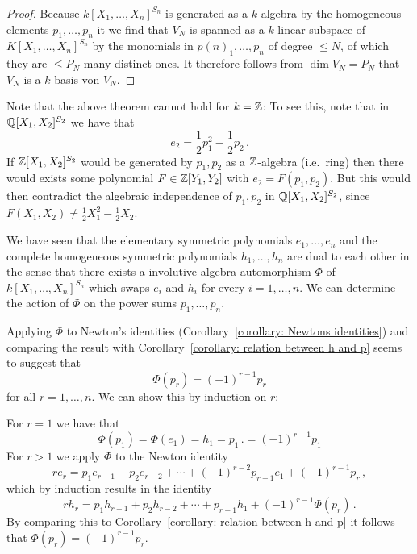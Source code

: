 \begin{proof}
  Because $k[X_1, \dotsc, X_n]^{S_n}$ is generated as a $k$-algebra by the homogeneous elements $p_1, \dotsc, p_n$ it we find that $V_N$ is spanned as a $k$-linear subspace of $K[X_1, \dotsc, X_n]^{S_n}$ by the monomials in $p{(n)}_1, \dotsc, p_n$ of degree $\leq N$, of which they are $\leq P_N$ many distinct ones.
  It therefore follows from $\dim V_N = P_N$ that $V_N$ is a $k$-basis von $V_N$.
\end{proof}


\begin{remark}
  Note that the above theorem cannot hold for $k = \mathbb{Z}$:
  To see this, note that in $\mathbb{Q}[X_1, X_2]^{S_2}$ we have that
  \[
      e_2
    = \frac{1}{2}  p_1^2 - \frac{1}{2} p_2 \,.
  \]
  If $\mathbb{Z}[X_1, X_2]^{S_2}$ would be generated by $p_1, p_2$ as a $\mathbb{Z}$-algebra (i.e.\ ring) then there would exists some polynomial $F \in \mathbb{Z}[Y_1, Y_2]$ with $e_2 = F( p_1, p_2)$.
  But this would then contradict the algebraic independence of $p_1, p_2$ in $\mathbb{Q}[X_1, X_2]^{S_2}$, since $F(X_1, X_2) \neq \frac{1}{2} X_1^2 - \frac{1}{2} X_2$.
\end{remark}


% 


\begin{fluff}
  We have seen that the elementary symmetric polynomials $e_1, \dotsc, e_n$ and the complete homogeneous symmetric polynomials $h_1, \dotsc, h_n$ are dual to each other in the sense that there exists a involutive algebra automorphism $\Phi$ of $k[X_1, \dotsc, X_n]^{S_n}$ which swaps $e_i$ and $h_i$ for every $i = 1, \dotsc, n$.
  We can determine the action of $\Phi$ on the power sums $p_1, \dotsc, p_n$.
  
  Applying $\Phi$ to Newton’s identities (Corollary~\ref{corollary: Newtons identities}) and comparing the result with Corollary~\ref{corollary: relation between h and p} seems to suggest that
  \[
      \Phi(p_r)
    = (-1)^{r-1} p_r
  \]
  for all $r = 1, \dotsc, n$.
  We can show this by induction on $r$:
  
  For $r = 1$ we have that
  \[
      \Phi(p_1)
    = \Phi(e_1)
    = h_1
    = p_1 \,.
    = (-1)^{r-1} p_1
  \]
  For $r > 1$ we apply $\Phi$ to the Newton identity
  \[
      r e_r
    =   p_1 e_{r-1}
      - p_2 e_{r-2}
      + \dotsb
      + (-1)^{r-2}  p_{r-1} e_1
      + (-1)^{r-1}  p_r \,,
  \]
  which by induction results in the identity
  \[
      r h_r
    =   p_1 h_{r-1}
      + p_2 h_{r-2}
      + \dotsb
      + p_{r-1} h_1
      + (-1)^{r-1} \Phi(p_r) \,.
  \]
  By comparing this to Corollary~\ref{corollary: relation between h and p} it follows that $\Phi( p_r ) = (-1)^{r-1} p_r$.
\end{fluff}





